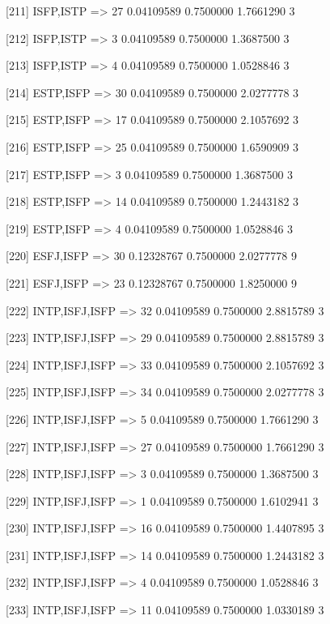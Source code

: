 [211] {ISFP,ISTP}           => {27} 0.04109589 0.7500000  1.7661290  3   

[212] {ISFP,ISTP}           => {3}  0.04109589 0.7500000  1.3687500  3   

[213] {ISFP,ISTP}           => {4}  0.04109589 0.7500000  1.0528846  3   

[214] {ESTP,ISFP}           => {30} 0.04109589 0.7500000  2.0277778  3   

[215] {ESTP,ISFP}           => {17} 0.04109589 0.7500000  2.1057692  3   

[216] {ESTP,ISFP}           => {25} 0.04109589 0.7500000  1.6590909  3   

[217] {ESTP,ISFP}           => {3}  0.04109589 0.7500000  1.3687500  3   

[218] {ESTP,ISFP}           => {14} 0.04109589 0.7500000  1.2443182  3   

[219] {ESTP,ISFP}           => {4}  0.04109589 0.7500000  1.0528846  3   

[220] {ESFJ,ISFP}           => {30} 0.12328767 0.7500000  2.0277778  9   

[221] {ESFJ,ISFP}           => {23} 0.12328767 0.7500000  1.8250000  9   

[222] {INTP,ISFJ,ISFP}      => {32} 0.04109589 0.7500000  2.8815789  3   

[223] {INTP,ISFJ,ISFP}      => {29} 0.04109589 0.7500000  2.8815789  3   

[224] {INTP,ISFJ,ISFP}      => {33} 0.04109589 0.7500000  2.1057692  3   

[225] {INTP,ISFJ,ISFP}      => {34} 0.04109589 0.7500000  2.0277778  3   

[226] {INTP,ISFJ,ISFP}      => {5}  0.04109589 0.7500000  1.7661290  3   

[227] {INTP,ISFJ,ISFP}      => {27} 0.04109589 0.7500000  1.7661290  3   

[228] {INTP,ISFJ,ISFP}      => {3}  0.04109589 0.7500000  1.3687500  3   

[229] {INTP,ISFJ,ISFP}      => {1}  0.04109589 0.7500000  1.6102941  3   

[230] {INTP,ISFJ,ISFP}      => {16} 0.04109589 0.7500000  1.4407895  3   

[231] {INTP,ISFJ,ISFP}      => {14} 0.04109589 0.7500000  1.2443182  3   

[232] {INTP,ISFJ,ISFP}      => {4}  0.04109589 0.7500000  1.0528846  3   

[233] {INTP,ISFJ,ISFP}      => {11} 0.04109589 0.7500000  1.0330189  3   

